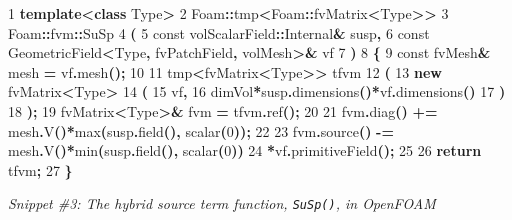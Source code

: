 \documentclass[
]{book}
\newenvironment{Shaded}{\begin{snugshade}}{\end{snugshade}}
\newcommand{\AttributeTok}[1]{\textcolor[rgb]{0.77,0.63,0.00}{#1}}
\newcommand{\ControlFlowTok}[1]{\textcolor[rgb]{0.13,0.29,0.53}{\textbf{#1}}}
\newcommand{\DecValTok}[1]{\textcolor[rgb]{0.00,0.00,0.81}{#1}}
\newcommand{\KeywordTok}[1]{\textcolor[rgb]{0.13,0.29,0.53}{\textbf{#1}}}
\newcommand{\NormalTok}[1]{#1}
\newcommand{\OperatorTok}[1]{\textcolor[rgb]{0.81,0.36,0.00}{\textbf{#1}}}
\begin{document}
\begin{Shaded}
\begin{Highlighting}[]
\DecValTok{1}   \KeywordTok{template}\OperatorTok{\textless{}}\KeywordTok{class}\NormalTok{ Type}\OperatorTok{\textgreater{}}
\DecValTok{2}\NormalTok{   Foam}\OperatorTok{::}\NormalTok{tmp}\OperatorTok{\textless{}}\NormalTok{Foam}\OperatorTok{::}\NormalTok{fvMatrix}\OperatorTok{\textless{}}\NormalTok{Type}\OperatorTok{\textgreater{}\textgreater{}}
\DecValTok{3}\NormalTok{   Foam}\OperatorTok{::}\NormalTok{fvm}\OperatorTok{::}\NormalTok{SuSp}
\DecValTok{4}   \OperatorTok{(}
\DecValTok{5}       \AttributeTok{const}\NormalTok{ volScalarField}\OperatorTok{::}\NormalTok{Internal}\OperatorTok{\&}\NormalTok{ susp}\OperatorTok{,}
\DecValTok{6}       \AttributeTok{const}\NormalTok{ GeometricField}\OperatorTok{\textless{}}\NormalTok{Type}\OperatorTok{,}\NormalTok{ fvPatchField}\OperatorTok{,}\NormalTok{ volMesh}\OperatorTok{\textgreater{}\&}\NormalTok{ vf}
\DecValTok{7}   \OperatorTok{)}
\DecValTok{8}   \OperatorTok{\{}
\DecValTok{9}       \AttributeTok{const}\NormalTok{ fvMesh}\OperatorTok{\&}\NormalTok{ mesh }\OperatorTok{=}\NormalTok{ vf}\OperatorTok{.}\NormalTok{mesh}\OperatorTok{();}
\DecValTok{10}  
\DecValTok{11}\NormalTok{      tmp}\OperatorTok{\textless{}}\NormalTok{fvMatrix}\OperatorTok{\textless{}}\NormalTok{Type}\OperatorTok{\textgreater{}\textgreater{}}\NormalTok{ tfvm}
\DecValTok{12}      \OperatorTok{(}
\DecValTok{13}          \KeywordTok{new}\NormalTok{ fvMatrix}\OperatorTok{\textless{}}\NormalTok{Type}\OperatorTok{\textgreater{}}
\DecValTok{14}          \OperatorTok{(}
\DecValTok{15}\NormalTok{              vf}\OperatorTok{,}
\DecValTok{16}\NormalTok{              dimVol}\OperatorTok{*}\NormalTok{susp}\OperatorTok{.}\NormalTok{dimensions}\OperatorTok{()*}\NormalTok{vf}\OperatorTok{.}\NormalTok{dimensions}\OperatorTok{()}
\DecValTok{17}          \OperatorTok{)}
\DecValTok{18}      \OperatorTok{);}
\DecValTok{19}\NormalTok{      fvMatrix}\OperatorTok{\textless{}}\NormalTok{Type}\OperatorTok{\textgreater{}\&}\NormalTok{ fvm }\OperatorTok{=}\NormalTok{ tfvm}\OperatorTok{.}\NormalTok{ref}\OperatorTok{();}
\DecValTok{20}  
\DecValTok{21}\NormalTok{      fvm}\OperatorTok{.}\NormalTok{diag}\OperatorTok{()} \OperatorTok{+=}\NormalTok{ mesh}\OperatorTok{.}\NormalTok{V}\OperatorTok{()*}\NormalTok{max}\OperatorTok{(}\NormalTok{susp}\OperatorTok{.}\NormalTok{field}\OperatorTok{(),}\NormalTok{ scalar}\OperatorTok{(}\DecValTok{0}\OperatorTok{));}
\DecValTok{22}  
\DecValTok{23}\NormalTok{      fvm}\OperatorTok{.}\NormalTok{source}\OperatorTok{()} \OperatorTok{{-}=}\NormalTok{ mesh}\OperatorTok{.}\NormalTok{V}\OperatorTok{()*}\NormalTok{min}\OperatorTok{(}\NormalTok{susp}\OperatorTok{.}\NormalTok{field}\OperatorTok{(),}\NormalTok{ scalar}\OperatorTok{(}\DecValTok{0}\OperatorTok{))}
\DecValTok{24}          \OperatorTok{*}\NormalTok{vf}\OperatorTok{.}\NormalTok{primitiveField}\OperatorTok{();}
\DecValTok{25}  
\DecValTok{26}      \ControlFlowTok{return}\NormalTok{ tfvm}\OperatorTok{;}
\DecValTok{27}  \OperatorTok{\}}
\end{Highlighting}
\end{Shaded}

\emph{Snippet \#3: The hybrid source term function, \texttt{SuSp()}, in OpenFOAM}

  
\end{document}
